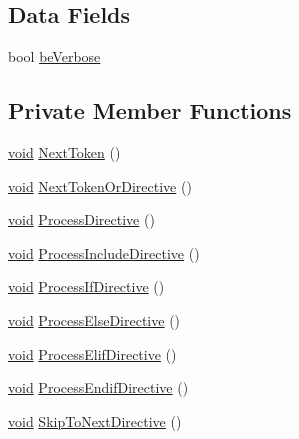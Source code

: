 \subsection*{Data Fields}
\begin{DoxyCompactItemize}
\item 
bool \hyperlink{class_lexer__t_a8970cd82a118fec46d9b94e66d5a857f}{be\+Verbose}
\end{DoxyCompactItemize}
\subsection*{Private Member Functions}
\begin{DoxyCompactItemize}
\item 
\hyperlink{_t_e_m_p_l_a_t_e__cdef_8h_ac9c84fa68bbad002983e35ce3663c686}{void} \hyperlink{class_lexer__t_acdfc28410c6fa02431dc5b0d8eaf6dfe}{Next\+Token} ()
\item 
\hyperlink{_t_e_m_p_l_a_t_e__cdef_8h_ac9c84fa68bbad002983e35ce3663c686}{void} \hyperlink{class_lexer__t_a89d6d4662c92c353287d5a1a9d928a87}{Next\+Token\+Or\+Directive} ()
\item 
\hyperlink{_t_e_m_p_l_a_t_e__cdef_8h_ac9c84fa68bbad002983e35ce3663c686}{void} \hyperlink{class_lexer__t_ae1d3fd3836cf0eda071264cf28e72846}{Process\+Directive} ()
\item 
\hyperlink{_t_e_m_p_l_a_t_e__cdef_8h_ac9c84fa68bbad002983e35ce3663c686}{void} \hyperlink{class_lexer__t_acdd9a9b146e32dc1da868295a234b93c}{Process\+Include\+Directive} ()
\item 
\hyperlink{_t_e_m_p_l_a_t_e__cdef_8h_ac9c84fa68bbad002983e35ce3663c686}{void} \hyperlink{class_lexer__t_a5614319aa2d55284fb8695ca22f6797e}{Process\+If\+Directive} ()
\item 
\hyperlink{_t_e_m_p_l_a_t_e__cdef_8h_ac9c84fa68bbad002983e35ce3663c686}{void} \hyperlink{class_lexer__t_a8fd4065139f3589521658ac1d1406b7f}{Process\+Else\+Directive} ()
\item 
\hyperlink{_t_e_m_p_l_a_t_e__cdef_8h_ac9c84fa68bbad002983e35ce3663c686}{void} \hyperlink{class_lexer__t_aa21e77ed1eb9a6fdb0959ddffd088e0c}{Process\+Elif\+Directive} ()
\item 
\hyperlink{_t_e_m_p_l_a_t_e__cdef_8h_ac9c84fa68bbad002983e35ce3663c686}{void} \hyperlink{class_lexer__t_a7c92f55cf52b6571582be6691ea923ea}{Process\+Endif\+Directive} ()
\item 
\hyperlink{_t_e_m_p_l_a_t_e__cdef_8h_ac9c84fa68bbad002983e35ce3663c686}{void} \hyperlink{class_lexer__t_a3dbb67f205f82cb0da886aa2534a2b6b}{Skip\+To\+Next\+Directive} ()

\end{DoxyCompactItemize}
